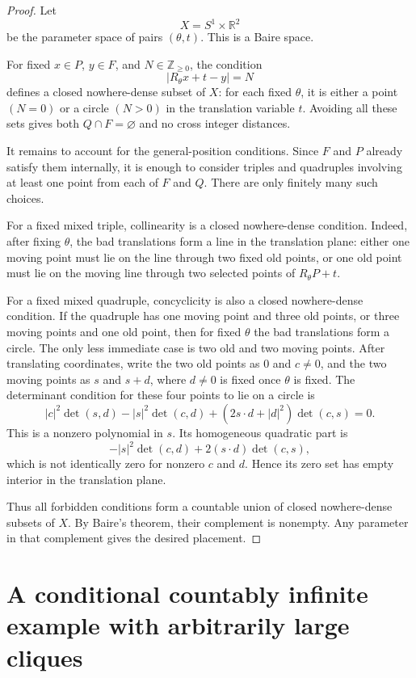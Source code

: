 \documentclass[11pt]{article}
\newcommand{\R}{\mathbb R}
\newcommand{\Z}{\mathbb Z}
\newcommand{\cross}[2]{\det(#1,#2)}
\begin{document}
\begin{proof}
Let
\[
X=S^1\times \R^2
\]
be the parameter space of pairs \((\theta,t)\). This is a Baire space.

For fixed \(x\in P\), \(y\in F\), and \(N\in\Z_{\geq 0}\), the condition
\[
|R_\theta x+t-y|=N
\]
defines a closed nowhere-dense subset of \(X\): for each fixed \(\theta\), it is either a point \((N=0)\) or a circle \((N>0)\) in the translation variable \(t\). Avoiding all these sets gives both \(Q\cap F=\varnothing\) and no cross integer distances.

It remains to account for the general-position conditions. Since \(F\) and \(P\) already satisfy them internally, it is enough to consider triples and quadruples involving at least one point from each of \(F\) and \(Q\). There are only finitely many such choices.

For a fixed mixed triple, collinearity is a closed nowhere-dense condition. Indeed, after fixing \(\theta\), the bad translations form a line in the translation plane: either one moving point must lie on the line through two fixed old points, or one old point must lie on the moving line through two selected points of \(R_\theta P+t\).

For a fixed mixed quadruple, concyclicity is also a closed nowhere-dense condition. If the quadruple has one moving point and three old points, or three moving points and one old point, then for fixed \(\theta\) the bad translations form a circle. The only less immediate case is two old and two moving points. After translating coordinates, write the two old points as \(0\) and \(c\neq 0\), and the two moving points as \(s\) and \(s+d\), where \(d\neq 0\) is fixed once \(\theta\) is fixed. The determinant condition for these four points to lie on a circle is
\[
|c|^2\cross{s}{d}-|s|^2\cross{c}{d}+(2s\cdot d+|d|^2)\cross{c}{s}=0.
\]
This is a nonzero polynomial in \(s\). Its homogeneous quadratic part is
\[
-|s|^2\cross{c}{d}+2(s\cdot d)\cross{c}{s},
\]
which is not identically zero for nonzero \(c\) and \(d\). Hence its zero set has empty interior in the translation plane.

Thus all forbidden conditions form a countable union of closed nowhere-dense subsets of \(X\). By Baire's theorem, their complement is nonempty. Any parameter in that complement gives the desired placement.
\end{proof}

\section{A conditional countably infinite example with arbitrarily large cliques}
\end{document}
